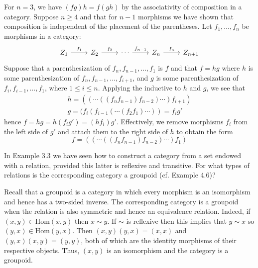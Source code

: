 \documentclass[../../master.tex]{subfiles}
\begin{document}
    \begin{solution}
      For \(n = 3\), we have \((fg)h = f(gh)\) by the associativity of composition in a category.
      Suppose \(n \geq 4\) and that for \(n - 1\) morphisms we have shown that composition is independent of the placement of the parentheses.
      Let \(f_{1}, \ldots, f_{n}\) be morphisms in a category:
      \[
      \begin{tikzcd}
        {Z_{1}} & {Z_{2}} & {\cdots} & {Z_{n}} & {Z_{n+1}}
        \arrow["{f_{1}}", from=1-1, to=1-2]
        \arrow["{f_{2}}", from=1-2, to=1-3]
        \arrow["{f_{n-1}}", from=1-3, to=1-4]
        \arrow["{f_{n}}", from=1-4, to=1-5]
      \end{tikzcd}
      \]
      Suppose that a parenthesization of \(f_{n}, f_{n-1}, \ldots, f_{1}\) is \(f\) and that
      \(f = hg\) where \(h\) is some parenthesization of \(f_{n}, f_{n-1}, \ldots, f_{i+1}\),
      and \(g\) is some parenthesization of \(f_{i}, f_{i-1}, \ldots, f_{1}\), where \(1 \leq i \leq n\).
      Applying the inductive to \(h\) and \(g\), we see that
      \begin{gather*}
        h = ((\cdots ((f_{n}f_{n-1}) f_{n-2}) \cdots) f_{i+1}) \\
        g = (f_{i} (f_{i-1} (\cdots (f_{2} f_{1}) \cdots)) = f_{i} g'
      \end{gather*}
      hence \(f = hg = h (f_{i} g') = (h f_{i}) g'\).
      Effectively, we remove morphisms \(f_{i}\) from the left side of \(g'\) and attach them to the right side of \(h\) to obtain the form
      \begin{equation*}
        f = ((\cdots ((f_{n} f_{n-1}) f_{n-2}) \cdots) f_{1})
      \end{equation*}
    \end{solution}

    \begin{problem}
      In Example 3.3 we have seen how to construct a category from a set endowed with a relation,
      provided this latter is reflexive and transitive.
      For what types of relations is the corresponding category a groupoid (cf. Example 4.6)?
    \end{problem}

    \begin{solution}
      Recall that a groupoid is a category in which every morphism is an isomorphism and hence has a two-sided inverse.
      The corresponding category is a groupoid when the relation is also symmetric and hence an equivalence relation.
      Indeed, if \((x, y) \in \text{Hom}(x, y)\) then \(x \sim y\).
      If \(\sim\) is reflexive then this implies that \(y \sim x\) so \((y, x) \in \text{Hom}(y, x)\).
      Then \((x, y) (y, x) = (x, x)\) and \((y, x) (x, y) = (y, y)\), both of which are the identity morphisms of their respective objects.
      Thus, \((x, y)\) is an isomorphism and the category is a groupoid.
    \end{solution}
\end{document}
